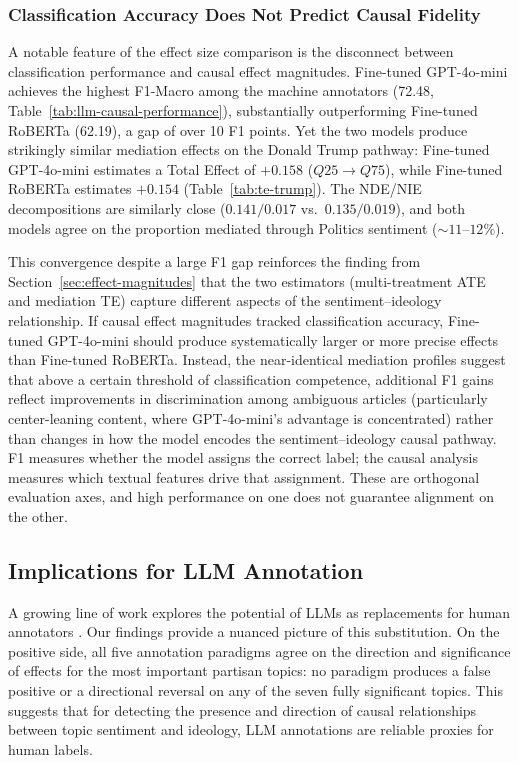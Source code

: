 \subsubsection{Classification Accuracy Does Not Predict Causal Fidelity}

A notable feature of the effect size comparison is the disconnect between classification performance and causal effect magnitudes. Fine-tuned GPT-4o-mini achieves the highest F1-Macro among the machine annotators (72.48, Table~\ref{tab:llm-causal-performance}), substantially outperforming Fine-tuned RoBERTa (62.19), a gap of over 10 F1 points. Yet the two models produce strikingly similar mediation effects on the Donald Trump pathway: Fine-tuned GPT-4o-mini estimates a Total Effect of $+0.158$ ($Q25 \to Q75$), while Fine-tuned RoBERTa estimates $+0.154$ (Table~\ref{tab:te-trump}). The NDE/NIE decompositions are similarly close ($0.141/0.017$ vs.\ $0.135/0.019$), and both models agree on the proportion mediated through Politics sentiment (${\sim}11$--$12\%$).

This convergence despite a large F1 gap reinforces the finding from Section~\ref{sec:effect-magnitudes} that the two estimators (multi-treatment ATE and mediation TE) capture different aspects of the sentiment--ideology relationship. If causal effect magnitudes tracked classification accuracy, Fine-tuned GPT-4o-mini should produce systematically larger or more precise effects than Fine-tuned RoBERTa. Instead, the near-identical mediation profiles suggest that above a certain threshold of classification competence, additional F1 gains reflect improvements in discrimination among ambiguous articles (particularly center-leaning content, where GPT-4o-mini's advantage is concentrated) rather than changes in how the model encodes the sentiment--ideology causal pathway. F1 measures whether the model assigns the correct label; the causal analysis measures which textual features drive that assignment. These are orthogonal evaluation axes, and high performance on one does not guarantee alignment on the other.

\subsection{Implications for LLM Annotation}

A growing line of work explores the potential of LLMs as replacements for human annotators \citep{horton2023large, ma-etal-2025-algorithmic, gao2025LLMscaution}. Our findings provide a nuanced picture of this substitution. On the positive side, all five annotation paradigms agree on the direction and significance of effects for the most important partisan topics: no paradigm produces a false positive or a directional reversal on any of the seven fully significant topics. This suggests that for detecting the presence and direction of causal relationships between topic sentiment and ideology, LLM annotations are reliable proxies for human labels.

